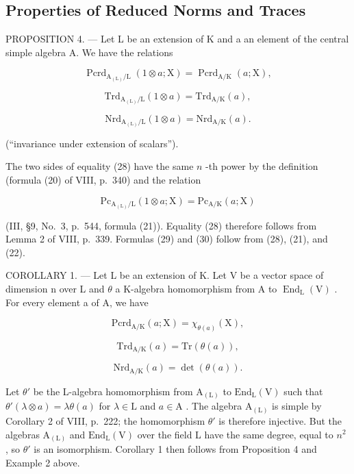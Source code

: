 \subsection{Properties of Reduced Norms and Traces}

PROPOSITION 4. --- Let L be an extension of K and a an element of the central simple algebra A. We have the relations

\[
\operatorname{Pcrd} _ {\mathrm{A} _ {(\mathrm{L})} / \mathrm{L}} (1 \otimes a; \mathrm{X}) = \operatorname{Pcrd} _ {\mathrm{A} / \mathrm{K}} (a; \mathrm{X}),\tag{28}
\]

\[
\mathrm{Trd} _ {\mathrm{A} _ {(\mathrm{L})} / \mathrm{L}} (1 \otimes a) = \mathrm{Trd} _ {\mathrm{A} / \mathrm{K}} (a),\tag{29}
\]

\[
\mathrm{Nrd} _ {\mathrm{A} _ {(\mathrm{L})} / \mathrm{L}} (1 \otimes a) = \mathrm{Nrd} _ {\mathrm{A} / \mathrm{K}} (a).\tag{30}
\]

(``invariance under extension of scalars'').

The two sides of equality (28) have the same \(n\) -th power by the definition (formula (20) of VIII, p.~340) and the relation

\[
\mathrm{Pc} _ {\mathrm{A} _ {(\mathrm{L})} / \mathrm{L}} (1 \otimes a; \mathrm{X}) = \mathrm{Pc} _ {\mathrm{A} / \mathrm{K}} (a; \mathrm{X})
\]

(III, §9, No.~3, p.~544, formula (21)). Equality (28) therefore follows from Lemma 2 of VIII, p.~339. Formulas (29) and (30) follow from (28), (21), and (22).

COROLLARY 1. --- Let L be an extension of K. Let V be a vector space of dimension n over L and \(\theta\) a K-algebra homomorphism from A to \(\operatorname{End}_{\mathrm{L}}(\mathrm{V})\) . For every element a of A, we have

\[
\mathrm{Pcrd} _ {\mathrm{A/K}} (a; \mathrm{X}) = \chi_ {\theta (a)} (\mathrm{X}),\tag{31}
\]

\[
\mathrm{Trd} _ {\mathrm{A/K}} (a) = \mathrm{Tr} (\theta (a)),\tag{32}
\]

\[
\mathrm{Nrd} _ {\mathrm{A/K}} (a) = \det (\theta (a)).\tag{33}
\]

Let \(\theta'\) be the L-algebra homomorphism from \(\mathrm{A}_{(\mathrm{L})}\) to \(\mathrm{End}_{\mathrm{L}}(\mathrm{V})\) such that \(\theta'(\lambda \otimes a) = \lambda \theta(a)\) for \(\lambda \in \mathrm{L}\) and \(a \in \mathrm{A}\) . The algebra \(\mathrm{A}_{(\mathrm{L})}\) is simple by Corollary 2 of VIII, p.~222; the homomorphism \(\theta'\) is therefore injective. But the algebras \(\mathrm{A}_{(\mathrm{L})}\) and \(\mathrm{End}_{\mathrm{L}}(\mathrm{V})\) over the field L have the same degree, equal to \(n^2\) , so \(\theta'\) is an isomorphism. Corollary 1 then follows from Proposition 4 and Example 2 above.

